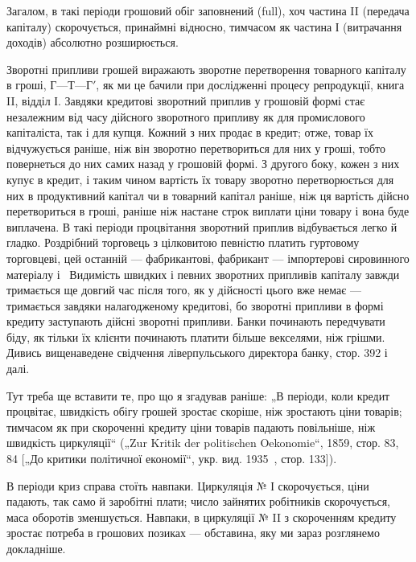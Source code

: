 Загалом, в такі періоди грошовий обіг заповнений (full),
хоч частина II (передача капіталу) скорочується, принаймні
відносно, тимчасом як частина І (витрачання доходів) абсолютно
розширюється.

Зворотні припливи грошей виражають зворотне перетворення
товарного капіталу в гроші, $Г — Т — Г'$, як ми це бачили при
дослідженні процесу репродукції, книга II, відділ І. Завдяки кредитові
зворотний приплив у грошовій формі стає незалежним
від часу дійсного зворотного припливу як для промислового капіталіста, так і для купця. Кожний з них
продає в кредит; отже,
товар їх відчужується раніше, ніж він зворотно перетвориться
для них у гроші, тобто повернеться до них самих назад у грошовій формі. З другого боку, кожен з них
купує в кредит, і таким
чином вартість їх товару зворотно перетворюється для них
в продуктивний капітал чи в товарний капітал раніше, ніж ця вартість дійсно перетвориться в гроші,
раніше ніж настане строк виплати ціни товару і вона буде виплачена. В такі періоди процвітання
зворотний приплив відбувається легко й гладко. Роздрібний
торговець з цілковитою певністю платить гуртовому торговцеві,
цей останній — фабрикантові, фабрикант — імпортерові сировинного матеріалу і~ Видимість швидких
і певних зворотних припливів капіталу завжди тримається ще довгий час після того, як у
дійсності цього вже немає — тримається завдяки налагодженому
кредитові, бо зворотні припливи в формі кредиту заступають
дійсні зворотні припливи. Банки починають передчувати біду,
як тільки їх клієнти починають платити більше векселями, ніж
грішми. Дивись вищенаведене свідчення ліверпульського директора банку, стор. 392 і далі.

Тут треба ще вставити те, про що я згадував раніше: „В періоди,
коли кредит процвітає, швидкість обігу грошей зростає скоріше,
ніж зростають ціни товарів; тимчасом як при скороченні кредиту ціни товарів падають повільніше, ніж
швидкість циркуляції“
(„Zur Kritik der politischen Oekonomie“, 1859, стор. 83, 84 [„До
критики політичної економії“, укр. вид. 1935~, стор. 133]).

В періоди криз справа стоїть навпаки. Циркуляція № І скорочується, ціни падають, так само й
заробітні плати; число зайнятих робітників скорочується, маса оборотів зменшується. Навпаки, в
циркуляції № II з скороченням кредиту зростає потреба
в грошових позиках — обставина, яку ми зараз розглянемо докладніше.

